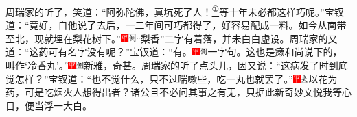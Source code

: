 周瑞家的听了，笑道：``阿弥陀佛，真坑死了人！\href{../Text/part0011_split_000.html\#lnkback_1_a}{\textsuperscript{①}}等十年未必都这样巧呢。''宝钗道：``竟好，自他说了去后，一二年间可巧都得了，好容易配成一料。如今从南带至北，现就埋在梨花树下。''{\includegraphics[width=3mm]{../Images/00002}\includegraphics[width=3mm]{../Images/00011}\footnotesize \kaishu ``梨香''二字有着落，并未白白虚设。}周瑞家的又道：``这药可有名字没有呢？''宝钗道：``有。{\includegraphics[width=3mm]{../Images/00002}\includegraphics[width=3mm]{../Images/00011}\footnotesize \kaishu 一字句。}这也是癞和尚说下的，叫作`冷香丸'。''{\includegraphics[width=3mm]{../Images/00002}\includegraphics[width=3mm]{../Images/00011}\footnotesize \kaishu 新雅，奇甚。}周瑞家的听了点头儿，因又说：``这病发了时到底觉怎样？''宝钗道：``也不觉什么，只不过喘嗽些，吃一丸也就罢了。''{\includegraphics[width=3mm]{../Images/00002}\includegraphics[width=3mm]{../Images/00012}\footnotesize \kaishu 以花为药，可是吃烟火人想得出者？诸公且不必问其事之有无，只据此新奇妙文悦我等心目，便当浮一大白。}

